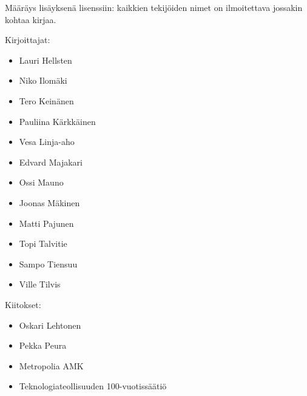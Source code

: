 Määräys lisäyksenä lisenssiin: kaikkien tekijöiden nimet on ilmoitettava jossakin kohtaa kirjaa.

Kirjoittajat:
\begin{itemize}
\item Lauri Hellsten
\item Niko Ilomäki
\item Tero Keinänen
\item Pauliina Kärkkäinen
\item Vesa Linja-aho
\item Edvard Majakari
\item Ossi Mauno
\item Joonas Mäkinen
\item Matti Pajunen
\item Topi Talvitie
\item Sampo Tiensuu
\item Ville Tilvis
\end{itemize}

Kiitokset:
\begin{itemize}
\item Oskari Lehtonen %
\item Pekka Peura %
\item Metropolia AMK %
\item Teknologiateollisuuden 100-vuotissäätiö %
\end{itemize}

%
%
%
%
